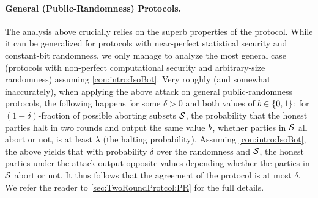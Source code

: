 \paragraph{General (Public-Randomness) Protocols.}\label{sec:technique:3:2}
\fi
The analysis above crucially relies on the superb properties of the protocol. While it can be generalized for protocols with near-perfect statistical security and constant-bit randomness, we only manage to analyze the most general case (\ie protocols with non-perfect computational security and arbitrary-size randomness) assuming  \cref{con:intro:IsoBot}.  Very roughly (and somewhat inaccurately), when applying the above attack on general public-randomness protocols, the following happens for  some $\delta>0$ and both values of $b\in \{0,1\}$:   for $(1-\delta)$-fraction of possible aborting subsets $\mathcal{S}$, the probability that the honest parties  halt in two rounds and output the same value $b$, whether parties in $\mathcal{S}$ all abort or not,  is at least  $\lambda$ (\ie the halting probability). Assuming \cref{con:intro:IsoBot},  the above yields that with probability $\delta$ over the randomness and $\mathcal{S}$, the honest parties under the attack output opposite values depending whether  the parties in ${\cal{S}}$ abort or not. It thus follows that the agreement of the protocol is at most $\delta$. We refer the reader to \cref{sec:TwoRoundProtcol:PR} for the full details.


